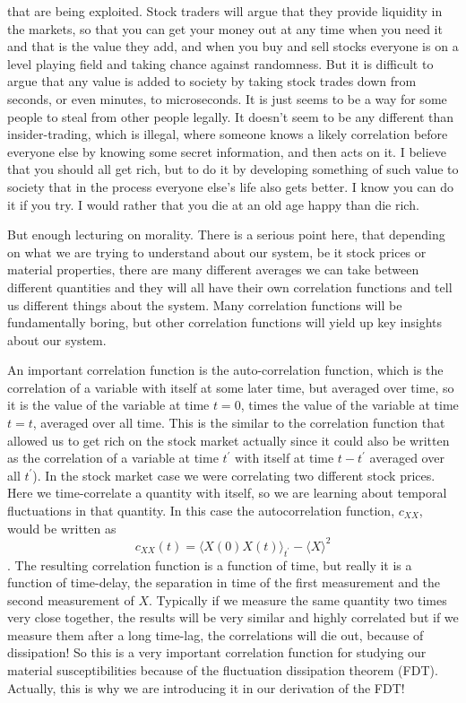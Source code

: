 \documentclass[]{revtex4}
\newcommand{\sm}[1]{{\[#1\]}}
\begin{document}
that are being exploited.   Stock traders will argue that they provide
liquidity in the markets, so that you can get your money out at any time when you need it and that is the value they add, and when you buy and sell
stocks everyone is on a level playing field and taking chance against randomness.
But it is difficult to argue that any value is added to society
by taking stock trades down from seconds, or even minutes, to microseconds. It is just seems to be a way for some people to steal from other people legally. It
doesn't seem to be any different than insider-trading, which is illegal, where someone knows a likely correlation before everyone else by knowing some
secret information, and then acts on it.  I believe
that you should all get rich, but to do it by developing something of such value to society that in the process everyone else's life also gets better.
I know you can  do it if you try.  I would rather that you die at an old age happy than die rich.

But enough lecturing on morality.  There is a serious point here, that depending on what we are trying to understand about our system, be it
stock prices or material properties, there are many different averages we can take between different quantities and they will all have their
own correlation functions and tell us different things about the system.  Many correlation functions will be fundamentally boring, but other
correlation functions will yield up key insights about our system.

An important correlation
function is the auto-correlation function, which is the correlation of a variable with itself at some later time, but averaged over time,
so it is the value of the variable at time $t=0$, times the value of the variable at time $t=t$, averaged over all time.
This is the similar to the correlation function that allowed us to get rich on the stock market actually since it
could also be written as the correlation of a variable at time $t^\prime$ with itself at time $t-t^\prime$ averaged over
all $t^\prime$). In the stock market case we were correlating two different stock prices.  Here we
time-correlate a quantity with itself, so we are learning about temporal fluctuations in that quantity.
In this case the autocorrelation function, $c_{XX}$, would be written as
\sm{c_{XX}(t)=\langle X(0)X(t)\rangle_{t^\prime}-\langle X\rangle^2}.
The resulting correlation function is a function of time, but really it is a function of time-delay,
the separation in time of the first measurement and the second measurement of $X$. Typically if
we measure the same quantity two times very close together, the results will be very similar and highly
correlated but if we measure them after a long time-lag, the correlations will die out, because of dissipation!
So this is a very important correlation function for studying our material susceptibilities because of the
fluctuation dissipation theorem (FDT).  Actually, this is why we are introducing it in our derivation of the FDT!
\end{document}
